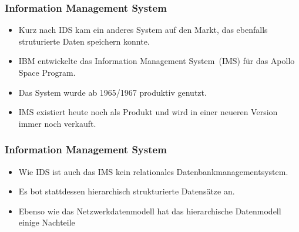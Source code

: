 \documentclass[aspectratio=169,mathserif,notheorems]{beamer}%
\begin{document}
%
\begin{frame}%
\frametitle{Information Management System}%
\begin{itemize}%
\item Kurz nach IDS kam ein anderes System auf den Markt, das ebenfalls struturierte Daten speichern konnte.%
\item<2-> IBM entwickelte das Information Management System~(IMS) für das Apollo Space Program\cite{KLBGNLWBS2012ITIYCGTIIMS}.%
\item<3-> Das System wurde ab 1965/1967 produktiv genutzt\cite{BBP2007TBOI}.%
\item<4-> IMS existiert heute noch als Produkt und wird in einer neueren Version immer noch verkauft.%
\end{itemize}%
\end{frame}%
%
\begin{frame}%
\frametitle{Information Management System}%
\begin{itemize}%
\item Wie IDS ist auch das IMS kein relationales Datenbankmanagementsystem.%
\item<2-> Es bot stattdessen hierarchisch strukturierte Datensätze an.%
\item<3-> Ebenso wie das Netzwerkdatenmodell hat das hierarchische Datenmodell einige Nachteile\cite{KC2024DS:ITD}%
\end{itemize}%
\end{frame}%
%
\end{document}
